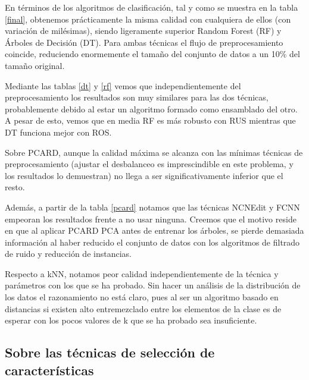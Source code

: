 En términos de los algoritmos de clasificación, tal y como se muestra en la tabla \ref{final}, obtenemos prácticamente la misma calidad con cualquiera de ellos (con variación de milésimas), siendo ligeramente superior Random Forest (RF) y Árboles de Decisión (DT). Para ambas técnicas el flujo de preprocesamiento coincide, reduciendo enormemente el tamaño del conjunto de datos a un 10\% del tamaño original.

Mediante las tablas \ref{dt} y \ref{rf} vemos que independientemente del preprocesamiento los resultados son muy similares para las dos técnicas, probablemente debido al estar un algoritmo formado como ensamblado del otro. A pesar de esto, vemos que en media RF es más robusto con RUS mientras que DT funciona mejor con ROS.

\vspace{\baselineskip}

Sobre PCARD, aunque la calidad máxima se alcanza con las mínimas técnicas de preprocesamiento (ajustar el desbalanceo es imprescindible en este problema, y los resultados lo demuestran) no llega a ser significativamente inferior que el resto. 

Además, a partir de la tabla \ref{pcard} notamos que las técnicas NCNEdit y FCNN empeoran los resultados frente a no usar ninguna. Creemos que el motivo reside en que al aplicar PCARD PCA antes de entrenar los árboles, se pierde demasiada información al haber reducido el conjunto de datos con los algoritmos de filtrado de ruido y reducción de instancias.

\vspace{\baselineskip}

Respecto a kNN, notamos peor calidad independientemente de la técnica y parámetros con los que se ha probado. Sin hacer un análisis de la distribución de los datos el razonamiento no está claro, pues al ser un algoritmo basado en distancias si existen alto entremezclado entre los elementos de la clase es de esperar con los pocos valores de k que se ha probado sea insuficiente.


\newpage

\subsection{Sobre las técnicas de selección de características}

